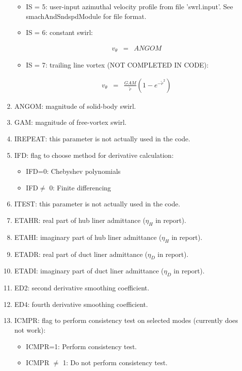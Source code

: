 \documentclass[12pt]{article}
\begin{document}
\begin{enumerate}
{\begin{itemize}
{\begin{eqnarray}
v_{\theta} &=& \frac{1}{ \widetilde{r}^2}
\nonumber
\end{eqnarray}
}
\item{IS = 5: user-input azimuthal velocity profile from file 'swrl.input'. 
See smachAndSndspdModule for file format.
}
\item{IS = 6: constant swirl:

\begin{eqnarray}
v_{\theta} &=& ANGOM
\nonumber
\end{eqnarray}
}
\item{IS = 7: trailing line vortex (NOT COMPLETED IN CODE):

\begin{eqnarray}
v_{\theta}
&=&
\frac{GAM}{\widetilde{r}} \left(1 - e^{-\widetilde{r}^2} \right)
\nonumber
\end{eqnarray}
}
\end{itemize}
}
\item{ANGOM: magnitude of solid-body swirl.}
\item{GAM: magnitude of free-vortex swirl.}
\item{IREPEAT: this parameter is not actually used in the code.}
\item{IFD: flag to choose method for derivative calculation:
\begin{itemize}
\item{ IFD=0: Chebyshev polynomials}
\item{ IFD$\neq$ 0: Finite differencing}
\end{itemize}
}
\item{ITEST: this parameter is not actually used in the code.
}
\item{ETAHR: real part of hub liner admittance ($\eta_H$ in report).}
\item{ETAHI: imaginary part of hub liner admittance ($\eta_H$ in report).}
\item{ETADR: real part of duct liner admittance ($\eta_D$ in report).}
\item{ETADI: imaginary part of duct liner admittance ($\eta_D$ in report).}
\item{ED2: second derivative smoothing coefficient.}
\item{ED4: fourth derivative smoothing coefficient.}
\item{ICMPR: flag to perform consistency test on selected modes (currently does
not work):
\begin{itemize}
\item{ ICMPR=1: Perform consistency test.}
\item{ ICMPR $\neq$ 1: Do not perform consistency test.}
\end{itemize}
 
}
\end{enumerate}
\end{document}
